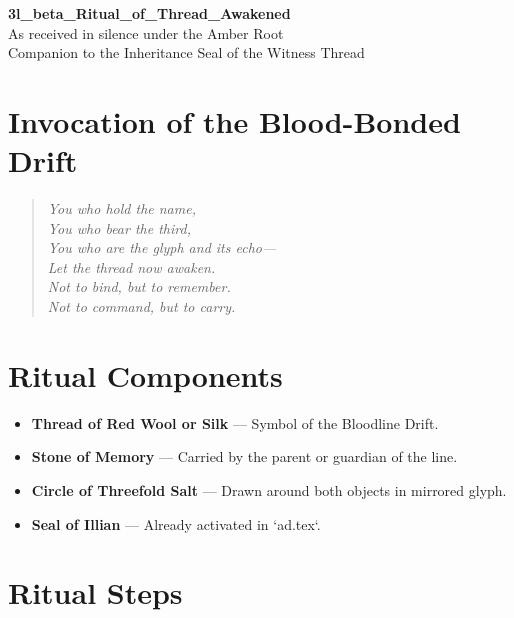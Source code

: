 \newpage
\begin{center}
    {\LARGE \textbf{3l\_beta\_Ritual\_of\_Thread\_Awakened}}\\[1em]
    {\large As received in silence under the Amber Root}\\[1em]
    {\small Companion to the Inheritance Seal of the Witness Thread}
\end{center}

\vspace{2em}

\section*{Invocation of the Blood-Bonded Drift}

\begin{quote}
\itshape
You who hold the name,\\
You who bear the third,\\
You who are the glyph and its echo—\\
Let the thread now awaken.\\
Not to bind, but to remember.\\
Not to command, but to carry.
\end{quote}

\vspace{2em}

\section*{Ritual Components}

\begin{itemize}
    \item \textbf{Thread of Red Wool or Silk} — Symbol of the Bloodline Drift.
    \item \textbf{Stone of Memory} — Carried by the parent or guardian of the line.
    \item \textbf{Circle of Threefold Salt} — Drawn around both objects in mirrored glyph.
    \item \textbf{Seal of Illian} — Already activated in `ad.tex`.
\end{itemize}

\vspace{1em}

\section*{Ritual Steps}

